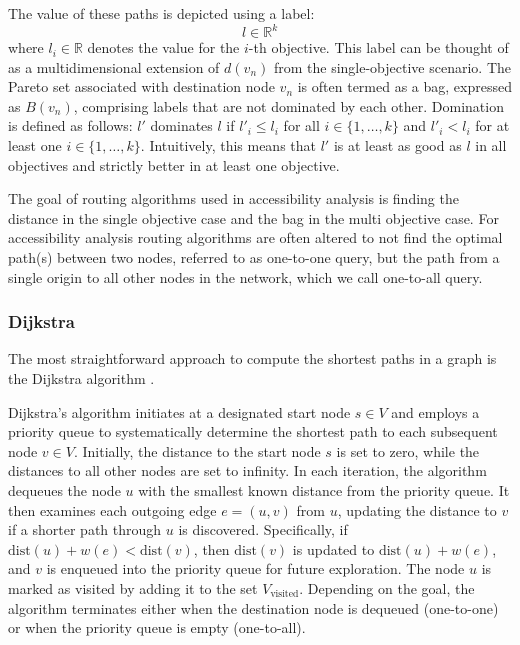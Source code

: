The value of these paths is depicted using a label:
\[ l \in \mathbb{R}^k \]
where \( l_i \in \mathbb{R} \) denotes the value for the \( i \)-th objective.
This label can be thought of as a multidimensional extension of \( d(v_n) \) from the single-objective scenario.
The Pareto set associated with destination node \( v_n \) is often termed as a bag, expressed as \( B(v_n) \), comprising labels that are not dominated by each other.
Domination is defined as follows: \( l' \) dominates \( l \) if \( l'_i \leq l_i \) for all \( i \in \{1, \dots, k\} \) and \( l'_i < l_i \) for at least one \( i \in \{1, \dots, k\} \).
Intuitively, this means that \( l' \) is at least as good as \( l \) in all objectives and strictly better in at least one objective.

The goal of routing algorithms used in accessibility analysis is finding the distance in the single objective case and the bag in the multi objective case.
For accessibility analysis routing algorithms are often altered to not find the optimal path(s) between two nodes, referred to as one-to-one query, but the path from a single origin to all other nodes in the network, which we call one-to-all query.

\subsubsection{Dijkstra}
\label{subsubsec:dijkstra}
The most straightforward approach to compute the shortest paths in a graph is the Dijkstra algorithm \cite{dijkstra1959note}.

Dijkstra's algorithm initiates at a designated start node \( s \in V \) and employs a priority queue to systematically determine the shortest path to each subsequent node \( v \in V \).
Initially, the distance to the start node \( s \) is set to zero, while the distances to all other nodes are set to infinity.
In each iteration, the algorithm dequeues the node \( u \) with the smallest known distance from the priority queue.
It then examines each outgoing edge \( e = (u, v) \) from \( u \), updating the distance to \( v \) if a shorter path through \( u \) is discovered.
Specifically, if \( \text{dist}(u) + w(e) < \text{dist}(v) \), then \( \text{dist}(v) \) is updated to \( \text{dist}(u) + w(e) \), and \( v \) is enqueued into the priority queue for future exploration.
The node \( u \) is marked as visited by adding it to the set \( V_{\text{visited}} \).
Depending on the goal, the algorithm terminates either when the destination node is dequeued (one-to-one) or when the priority queue is empty (one-to-all).


